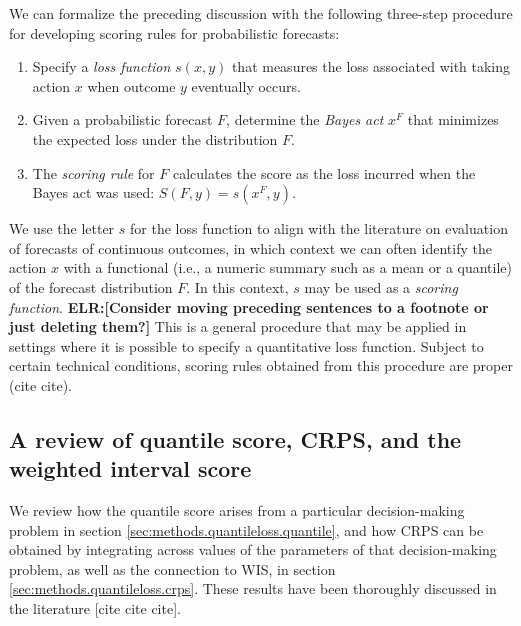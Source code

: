 \documentclass{article}
\def\elr#1{{\color{cyan}\textbf{ELR:[#1]}}}
\begin{document}
We can formalize the preceding discussion with the following three-step procedure for developing scoring rules for probabilistic forecasts:
\begin{enumerate}
\item Specify a \emph{loss function} $s(x, y)$ that measures the loss associated with taking action $x$ when outcome $y$ eventually occurs.
\item Given a probabilistic forecast $F$, determine the \emph{Bayes act} $x^F$ that minimizes the expected loss under the distribution $F$.
\item The \emph{scoring rule} for $F$ calculates the score as the loss incurred when the Bayes act was used: $S(F, y) = s(x^F, y)$.
\end{enumerate}
We use the letter $s$ for the loss function to align with the literature on evaluation of forecasts of continuous outcomes, in which context we can often identify the action $x$ with a functional (i.e., a numeric summary such as a mean or a quantile) of the forecast distribution $F$. In this context, $s$ may be used as a \emph{scoring function}. \elr{Consider moving preceding sentences to a footnote or just deleting them?}
This is a general procedure that may be applied in settings where it is possible to specify a quantitative loss function. Subject to certain technical conditions, scoring rules obtained from this procedure are proper (cite cite).



\subsection{A review of quantile score, CRPS, and the weighted interval score}
\label{sec:methods.quantileloss}

We review how the quantile score arises from a particular decision-making problem in section \ref{sec:methods.quantileloss.quantile}, and how CRPS can be obtained by integrating across values of the parameters of that decision-making problem, as well as the connection to WIS, in section \ref{sec:methods.quantileloss.crps}. These results have been thoroughly discussed in the literature [cite cite cite].
\end{document}
